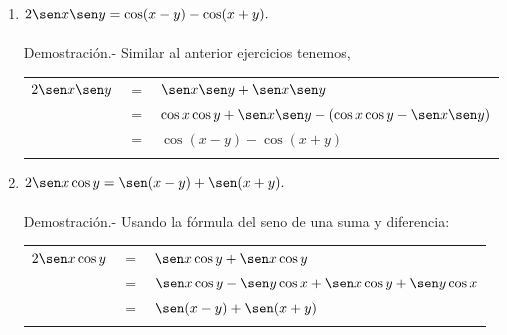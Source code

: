 \begin{enumerate}
\begin{enumerate}[\bfseries (a)]
	\item $2\sen x \sen y = \cos(x-y)-\cos(x+y).$\\\\
	    Demostración.-\; Similar al anterior ejercicios tenemos,\\
	    \begin{center}
		\begin{tabular}{rcl}
		    $2\sen x \sen y$&$=$&$\sen x \sen y + \sen x \sen y$\\
				    &$=$&$\cos x \cos y + \sen x \sen y - (\cos x \cos y - \sen x \sen y)$\\
				    &$=$&$\cos(x-y)-\cos(x+y)$\\\\
		\end{tabular}
	    \end{center}


	\item $2\sen x \cos y = \sen(x-y)+\sen(x+y).$\\\\
	    Demostración.-\; Usando la fórmula del seno de una suma y diferencia:\\
	    \begin{center}
		\begin{tabular}{rcl}
		    $2\sen x \cos y$&$=$&$\sen x \cos y + \sen x \cos y$\\
		      &$=$&$\sen x \cos y - \sen y \cos x + \sen x \cos y + \sen y \cos x$\\
		      &$=$&$\sen(x-y) + \sen(x+y)$\\\\
		\end{tabular}
	    \end{center}

    \end{enumerate}


\end{enumerate}
